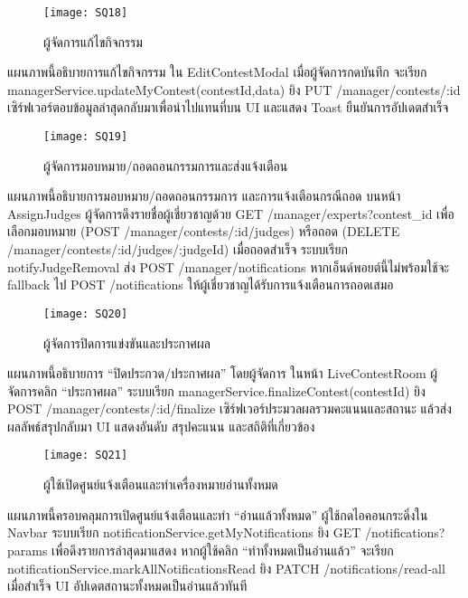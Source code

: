 \newpage

\begin{figure}[h]
	\centering
	\texttt{[image: SQ18]}
	\caption{ผู้จัดการแก้ไขกิจกรรม}
\end{figure}

\indent แผนภาพนี้อธิบายการแก้ไขกิจกรรม ใน EditContestModal เมื่อผู้จัดการกดบันทึก จะเรียก managerService.updateMyContest(contestId,data) ยิง PUT /manager/contests/:id เซิร์ฟเวอร์ตอบข้อมูลล่าสุดกลับมาเพื่อนำไปแทนที่บน UI และแสดง Toast ยืนยันการอัปเดตสำเร็จ

\vspace{\baselineskip}

\begin{figure}[h]
	\centering
	\texttt{[image: SQ19]}
	\caption{ผู้จัดการมอบหมาย/ถอดถอนกรรมการและส่งแจ้งเตือน}
\end{figure}

\indent แผนภาพนี้อธิบายการมอบหมาย/ถอดถอนกรรมการ และการแจ้งเตือนกรณีถอด บนหน้า AssignJudges ผู้จัดการดึงรายชื่อผู้เชี่ยวชาญด้วย GET /manager/experts?contest\_id เพื่อเลือกมอบหมาย (POST /manager/contests/:id/judges) หรือถอด (DELETE /manager/contests/:id/judges/:judgeId) เมื่อถอดสำเร็จ ระบบเรียก notifyJudgeRemoval ส่ง POST /manager/notifications หากเอ็นด์พอยต์นี้ไม่พร้อมใช้จะ fallback ไป POST /notifications ให้ผู้เชี่ยวชาญได้รับการแจ้งเตือนการถอดเสมอ

\newpage 

\begin{figure}[h]
	\centering
	\texttt{[image: SQ20]}
	\caption{ผู้จัดการปิดการแข่งขันและประกาศผล}
\end{figure}

\indent แผนภาพนี้อธิบายการ “ปิดประกวด/ประกาศผล” โดยผู้จัดการ ในหน้า LiveContestRoom ผู้จัดการคลิก “ประกาศผล” ระบบเรียก managerService.finalizeContest(contestId) ยิง POST /manager/contests/:id/finalize เซิร์ฟเวอร์ประมวลผลรวมคะแนนและสถานะ แล้วส่งผลลัพธ์สรุปกลับมา UI แสดงอันดับ สรุปคะแนน และสถิติที่เกี่ยวข้อง

\vspace{\baselineskip} 

\begin{figure}[h]
	\centering
	\texttt{[image: SQ21]}
	\caption{ผู้ใช้เปิดศูนย์แจ้งเตือนและทำเครื่องหมายอ่านทั้งหมด}
\end{figure}

\indent แผนภาพนี้ครอบคลุมการเปิดศูนย์แจ้งเตือนและทำ “อ่านแล้วทั้งหมด” ผู้ใช้กดไอคอนกระดิ่งใน Navbar ระบบเรียก notificationService.getMyNotifications ยิง GET /notifications?params เพื่อดึงรายการล่าสุดมาแสดง หากผู้ใช้คลิก “ทำทั้งหมดเป็นอ่านแล้ว” จะเรียก notificationService.markAllNotificationsRead ยิง PATCH /notifications/read-all เมื่อสำเร็จ UI อัปเดตสถานะทั้งหมดเป็นอ่านแล้วทันที


